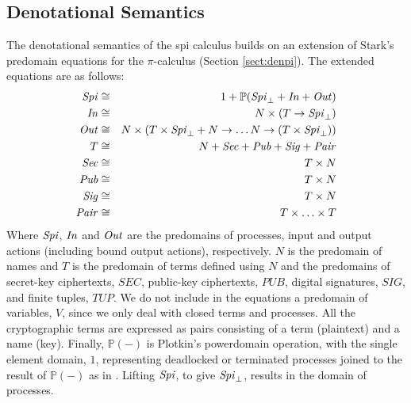 \documentclass[10pt,a4paper,final,oneside,fleqn]{book}
\begin{document}
\subsection{Denotational Semantics\label{sect:denspi}}
The denotational semantics of the spi calculus builds on an extension of Stark's predomain equations for the $\pi$-calculus (Section \ref{sect:denpi}). The extended equations are as follows:
\begin{eqnarray}
\mbox{{\itshape Spi\/}}&\cong&1+\mathbb{P}(\mbox{{\itshape Spi\/}}_\bot+\mbox{{\itshape In\/}}+\mbox{{\itshape Out\/}})\label{prespi1}\\
\mbox{{\itshape In\/}}&\cong&N\times(T\to\mbox{{\itshape Spi\/}}_\bot)\label{prespi2}\\
\mbox{{\itshape Out\/}}&\cong&N\times(T\times\mbox{{\itshape Spi\/}}_\bot+N\to\ldots N\to(T\times\mbox{{\itshape Spi\/}}_\bot))\label{prespi3}\\
T&\cong&N+\mbox{{\itshape Sec\/}}+\mbox{{\itshape Pub\/}}+\mbox{{\itshape Sig\/}}+\mbox{{\itshape Pair\/}}\label{prespi4}\\
\mbox{{\itshape Sec\/}}&\cong&T\times N\label{prespi5}\\
\mbox{{\itshape Pub\/}}&\cong&T\times N\label{prespi6}\\
\mbox{{\itshape Sig\/}}&\cong&T\times N\label{prespi7}\\
\mbox{{\itshape Pair\/}}&\cong&T\times\ldots\times T\label{prespi8}
\end{eqnarray}
Where $\mbox{{\itshape Spi\/}}$, $\mbox{{\itshape In\/}}$ and $\mbox{{\itshape Out\/}}$ are the predomains of processes, input and output actions (including bound output actions), respectively.  $N$ is the predomain of names and $T$ is the predomain of terms defined using $N$ and the predomains of secret-key ciphertexts, $SEC$, public-key ciphertexts, $PUB$, digital signatures, $SIG$, and finite tuples, $TUP$.  We do not include in the equations a predomain of variables, $V$, since we only deal with closed terms and processes. All the cryptographic terms are expressed as pairs consisting of a term (plaintext) and a name (key).  Finally, $\mathbb{P}(-)$ is Plotkin's powerdomain operation, with the single element domain, $1$, representing deadlocked or terminated processes joined to the result of $\mathbb{P}(-)$ as in \cite[Def. 3.4]{abramsky1}.  Lifting $\mbox{{\itshape Spi\/}}$, to give $\mbox{{\itshape Spi\/}}_\bot$, results in the domain of processes.
\end{document}
